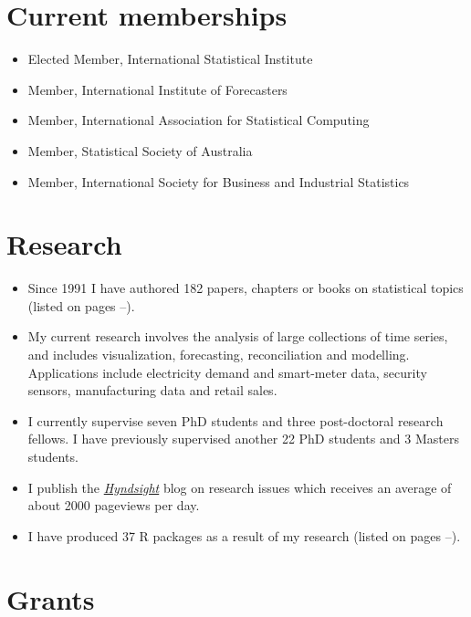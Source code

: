 \documentclass[10pt,a4paper,]{article}
\providecommand{\tightlist}{%
  \setlength{\itemsep}{0pt}\setlength{\parskip}{0pt}}
\newcounter{papers}
\begin{document}
\hypertarget{current-memberships}{%
\section{Current memberships}\label{current-memberships}}

\begin{itemize}
\tightlist
\item
  Elected Member, International Statistical Institute
\item
  Member, International Institute of Forecasters
\item
  Member, International Association for Statistical Computing
\item
  Member, Statistical Society of Australia
\item
  Member, International Society for Business and Industrial Statistics
\end{itemize}

\hypertarget{research}{%
\section{Research}\label{research}}

\begin{itemize}
\tightlist
\item
  Since 1991 I have authored 182 papers, chapters or books on statistical topics (listed on pages \pageref{papersstart}--\pageref{papersend}).
\item
  My current research involves the analysis of large collections of time series, and includes visualization, forecasting, reconciliation and modelling. Applications include electricity demand and smart-meter data, security sensors, manufacturing data and retail sales.
\item
  I currently supervise seven PhD students and three post-doctoral research fellows. I have previously supervised another 22 PhD students and 3 Masters students.
\item
  I publish the \href{https://robjhyndman.com/hyndsight}{\emph{Hyndsight}} blog on research issues which receives an average of about 2000 pageviews per day.
\item
  I have produced 37 R packages as a result of my research (listed on pages \pageref{packagestart}--\pageref{packageend}).
\end{itemize}

\hypertarget{grants}{%
\section{Grants}\label{grants}}
\end{document}
